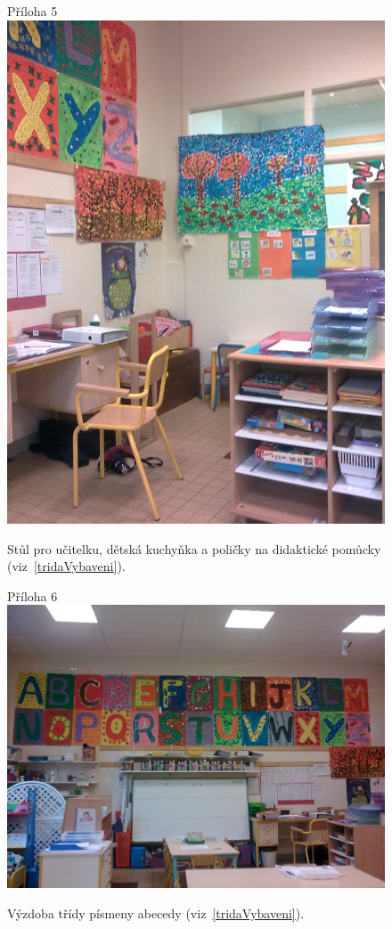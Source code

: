 	\begin{figure}[tb]
		\centering
		Příloha 5\\
		\includegraphics[height = 0.35\textheight]{./fotky/Obr5.jpg}
		\caption{
			Stůl pro učitelku, dětská kuchyňka a poličky na didaktické pomůcky (viz~\ref{tridaVybaveni}).
		}
		\label{Obr5}
	\end{figure}

	\begin{figure}[tb]
		\centering
		Příloha 6\\
		\includegraphics[height = 0.35\textheight]{./fotky/Obr6.jpg}
		\caption{
			Výzdoba třídy písmeny abecedy (viz~\ref{tridaVybaveni}).
		}
		\label{Obr6}
	\end{figure}


